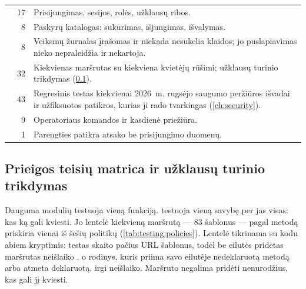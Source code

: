 \begin{xltabular}{\textwidth}{@{}L{38mm}rY@{}}
 & 17 & Prisijungimas, sesijos, rolės, užklausų ribos. \\
 & 8 & Paskyrų katalogas: sukūrimas, išjungimas, išvalymas. \\
 & 8 & Veiksmų žurnalas įrašomas ir niekada nesukelia klaidos; jo puslapiavimas nieko nepraleidžia ir nekartoja. \\
 & 32 & Kiekvienas maršrutas su kiekviena kvietėjų rūšimi; užklausų turinio trikdymas (\cref{sec:testing:api:matrix}). \\
 & 43 & Regresinis testas kiekvienai 2026~m. rugsėjo saugumo peržiūros išvadai ir užfiksuotos patikros, kurias ji rado tvarkingas (\cref{ch:security}). \\
 & 9 & Operatoriaus komandos ir kasdienė priežiūra. \\
 & 1 & Parengties patikra atsako be prisijungimo duomenų. \\
\end{xltabular}

\subsection{Prieigos teisių matrica ir užklausų turinio trikdymas}\label{sec:testing:api:matrix}

Dauguma modulių testuoja vieną funkciją.  testuoja vieną
savybę per jas visas: kas ką gali kviesti. Jo lentelė  kiekvieną 
maršrutą --- 83 šablonus --- pagal metodą priskiria vienai iš šešių politikų
(\cref{tab:testing:policies}). Lentelė tikrinama su kodu abiem kryptimis: testas skaito pačius
URL šablonus, todėl be eilutės pridėtas maršrutas neišlaiko ,
o rodinys, kuris priima savo eilutėje nedeklaruotą metodą arba atmeta deklaruotą, irgi
neišlaiko. Maršruto negalima pridėti nenurodžius, kas gali jį kviesti.


